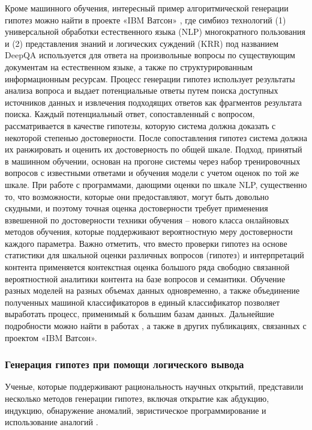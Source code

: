 Кроме машинного обучения, интересный пример алгоритмической генерации гипотез можно найти в проекте «IBM Ватсон» 
\cite{ferrucci2010building}, где симбиоз технологий (1) универсальной обработки естественного языка (NLP) многократного 
пользования и (2) представления знаний и логических суждений (KRR) под названием DeepQA используется для ответа на 
произвольные вопросы по существующим документам на естественном языке, а также по структурированным информационным 
ресурсам. Процесс генерации гипотез использует результаты анализа вопроса и выдает потенциальные ответы путем поиска 
доступных источников данных и извлечения подходящих ответов как фрагментов результата поиска. Каждый потенциальный 
ответ, сопоставленный с вопросом, рассматривается в качестве гипотезы, которую система должна доказать с некоторой 
степенью достоверности. После сопоставления гипотез система должна их ранжировать и оценить их достоверность по общей 
шкале. Подход, принятый в машинном обучении, основан на прогоне системы через набор тренировочных вопросов с известными 
ответами и обучения модели с учетом оценок по той же шкале. При работе с программами, дающими оценки по шкале NLP, 
существенно то, что возможности, которые они предоставляют, могут быть довольно скудными, и поэтому точная оценка 
достоверности требует применения взвешенной по достоверности техники обучения \cite{ferrucci2010building} – нового 
класса онлайновых методов обучения, которые поддерживают вероятностную меру достоверности каждого параметра. Важно 
отметить, что вместо проверки гипотез на основе статистики для шкальной оценки различных вопросов (гипотез) и 
интерпретаций контента применяется контекстная оценка большого ряда свободно связанной вероятностной аналитики контента 
на базе вопросов и семантики. Обучение разных моделей на разных объемах данных одновременно, а также объединение 
полученных машиной классификаторов в единый классификатор позволяет выработать процесс, применимый к большим базам 
данных. Дальнейшие подробности можно найти в работах \cite{ferrucci2010building, dredze2008confidence}, а также в 
других публикациях, связанных с проектом «IBM Ватсон». 

\subsubsection{Генерация гипотез при помощи логического вывода}\label{sect1_2_5_2}
Ученые, которые поддерживают рациональность научных открытий, представили несколько методов генерации гипотез, включая 
открытие как абдукцию, индукцию, обнаружение аномалий, эвристическое программирование и использование 
аналогий \cite{Woodward2011}.

